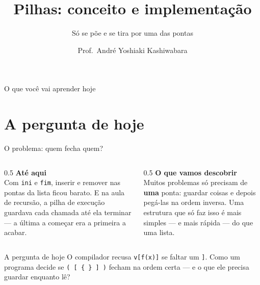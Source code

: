\documentclass[aspectratio=169]{beamer}
\title{Pilhas: conceito e implementação}
\subtitle{Só se põe e se tira por uma das pontas}
\author{Prof.\ André Yoshiaki Kashiwabara}
\institute{DCOMP -- Universidade Federal de Sergipe\\
\texttt{andreyoshiaki@dcomp.ufs.br}}
\date{}
\begin{document}
\begin{frame}[plain]
  \titlepage
\end{frame}

\begin{frame}{O que você vai aprender hoje}
  \begin{center}
  \end{center}
\end{frame}

\section{A pergunta de hoje}

\begin{frame}{O problema: quem fecha quem?}
  \begin{columns}[T]
    \begin{column}{0.5\textwidth}
      \textbf{Até aqui}\\[0.3em]
      \small
      Com \texttt{ini} e \texttt{fim}, inserir e remover nas pontas da lista
      ficou barato. E na aula de recursão, a pilha de execução guardava cada
      chamada até ela terminar --- a última a começar era a primeira a acabar.
    \end{column}
    \begin{column}{0.5\textwidth}
      \textbf{O que vamos descobrir}\\[0.3em]
      \small
      Muitos problemas só precisam de \textbf{uma} ponta: guardar coisas e
      depois pegá-las na ordem inversa. Uma estrutura que só faz isso é mais
      simples --- e mais rápida --- do que uma lista.
    \end{column}
  \end{columns}
  \begin{block}{A pergunta de hoje}
    O compilador recusa \texttt{v[f(x)]} se faltar um \texttt{]}. Como um
    programa decide se \texttt{( [ \{ \} ] )} fecham na ordem certa --- e o
    que ele precisa guardar enquanto lê?
  \end{block}
\end{frame}
\end{document}
